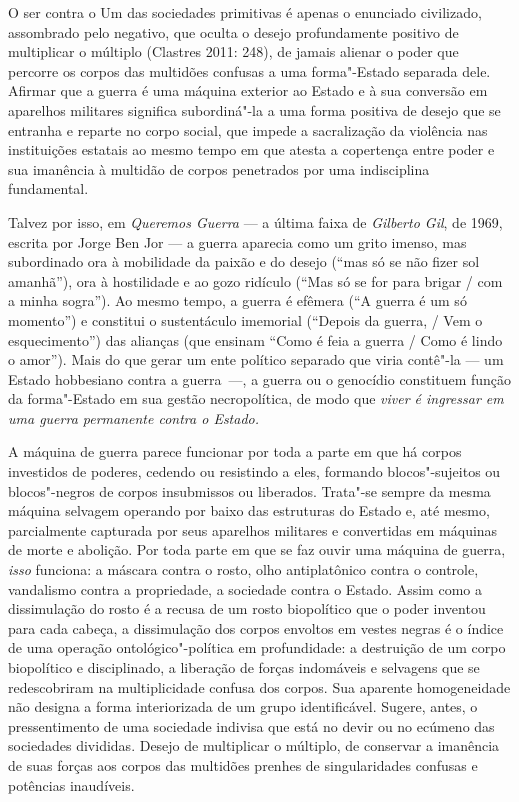 O ser contra o Um das sociedades primitivas é apenas o enunciado
civilizado, assombrado pelo negativo, que oculta o desejo profundamente
positivo de multiplicar o múltiplo (Clastres 2011: 248), de jamais
alienar o poder que percorre os corpos das multidões confusas a uma
forma"-Estado separada dele. Afirmar que a guerra é uma máquina exterior
ao Estado e à sua conversão em aparelhos militares significa
subordiná"-la a uma forma positiva de desejo que se entranha e reparte no
corpo social, que impede a sacralização da violência nas instituições
estatais ao mesmo tempo em que atesta a copertença entre poder e sua
imanência à multidão de corpos penetrados por uma indisciplina
fundamental.

Talvez por isso, em \emph{Queremos Guerra} --- a última faixa de
\emph{Gilberto Gil}, de 1969, escrita por Jorge Ben Jor --- a guerra
aparecia como um grito imenso, mas subordinado ora à mobilidade da
paixão e do desejo (``mas só se não fizer sol amanhã''), ora à
hostilidade e ao gozo ridículo (``Mas só se for para brigar / com a
minha sogra''). Ao mesmo tempo, a guerra é efêmera (``A guerra é um só
momento'') e constitui o sustentáculo imemorial (``Depois da guerra, /
Vem o esquecimento'') das alianças (que ensinam ``Como é feia a guerra /
Como é lindo o amor''). Mais do que gerar um ente político separado que
viria contê"-la --- um Estado hobbesiano contra a guerra~---, a guerra ou o
genocídio constituem função da forma"-Estado em sua gestão necropolítica,
de modo que \emph{viver é ingressar em uma guerra permanente contra o
Estado.}

A máquina de guerra parece funcionar por toda a parte em que há corpos
investidos de poderes, cedendo ou resistindo a eles, formando
blocos"-sujeitos ou blocos"-negros de corpos insubmissos ou liberados.
Trata"-se sempre da mesma máquina selvagem operando por baixo das
estruturas do Estado e, até mesmo, parcialmente capturada por seus
aparelhos militares e convertidas em máquinas de morte e abolição. Por
toda parte em que se faz ouvir uma máquina de guerra, \emph{isso
}funciona: a máscara contra o rosto, olho antiplatônico contra o
controle, vandalismo contra a propriedade, a sociedade contra o Estado.
Assim como a dissimulação do rosto é a recusa de um rosto biopolítico
que o poder inventou para cada cabeça, a dissimulação dos corpos
envoltos em vestes negras é o índice de uma operação ontológico"-política
em profundidade: a destruição de um corpo biopolítico e disciplinado, a
liberação de forças indomáveis e selvagens que se redescobriram na
multiplicidade confusa dos corpos. Sua aparente homogeneidade não
designa a forma interiorizada de um grupo identificável. Sugere, antes,
o pressentimento de uma sociedade indivisa que está no devir ou no
ecúmeno das sociedades divididas. Desejo de multiplicar o múltiplo, de
conservar a imanência de suas forças aos corpos das multidões prenhes de
singularidades confusas e potências inaudíveis.

